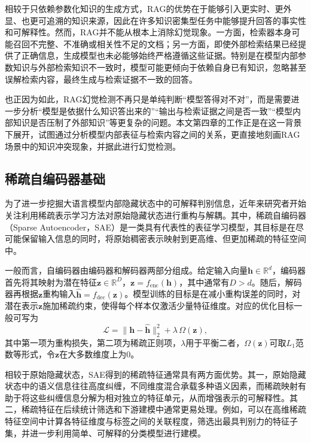 相较于只依赖参数化知识的生成方式，RAG的优势在于能够引入更实时、更外显、也更可追溯的知识来源，因此在许多知识密集型任务中能够提升回答的事实性和可解释性。然而，RAG并不能从根本上消除幻觉现象。一方面，检索器本身可能召回不完整、不准确或相关性不足的文档；另一方面，即使外部检索结果已经提供了正确信息，生成模型也未必能够始终严格遵循这些证据。特别是在模型内部参数知识与外部检索知识不一致时，模型可能更倾向于依赖自身已有知识，忽略甚至误解检索内容，最终生成与检索证据不一致的回答。

也正因为如此，RAG幻觉检测不再只是单纯判断“模型答得对不对”，而是需要进一步分析“模型是依据什么知识答出来的”“输出与检索证据之间是否一致”“模型内部知识是否压制了外部知识”等更复杂的问题。本文第四章的工作正是在这一背景下展开，试图通过分析模型内部表征与检索内容之间的关系，更直接地刻画RAG场景中的知识冲突现象，并据此进行幻觉检测。

\subsection{稀疏自编码器基础}

为了进一步挖掘大语言模型内部隐藏状态中的可解释判别信息，近年来研究者开始关注利用稀疏表示学习方法对原始隐藏状态进行重构与解耦。其中，稀疏自编码器（Sparse Autoencoder，SAE）\cite{shu2025survey,ng2011sparse,bricken2023towards,huben2024sparse}是一类具有代表性的表征学习模型，其目标是在尽可能保留输入信息的同时，将原始稠密表示映射到更高维、但更加稀疏的特征空间中。

一般而言，自编码器由编码器和解码器两部分组成。给定输入向量$\mathbf{h}\in\mathbb{R}^{d}$，编码器首先将其映射为潜在特征$\mathbf{z}\in\mathbb{R}^{D}$，$\mathbf{z}=f_{\mathrm{enc}}(\mathbf{h})$，其中通常有$D>d$。随后，解码器再根据$\mathbf{z}$重构输入$\hat{\mathbf{h}}=f_{\mathrm{dec}}(\mathbf{z})$。模型训练的目标是在减小重构误差的同时，对潜在表示$\mathbf{z}$施加稀疏约束，使得每个样本仅激活少量特征维度。对应的优化目标一般可写为
\begin{equation}
\mathcal{L}=\|\mathbf{h}-\hat{\mathbf{h}}\|_2^2+\lambda \,\Omega(\mathbf{z}),
\end{equation}
其中第一项为重构损失，第二项为稀疏正则项，$\lambda$用于平衡二者，$\Omega(\mathbf{z})$可取$L_1$范数等形式，令$\mathbf{z}$在大多数维度上为0。

相较于原始隐藏状态，SAE得到的稀疏特征通常具有两方面优势。其一，原始隐藏状态中的语义信息往往高度纠缠，不同维度混合承载多种语义因素，而稀疏映射有助于将这些纠缠信息分解为相对独立的特征单元，从而增强表示的可解释性。其二，稀疏特征在后续统计筛选和下游建模中通常更易处理。例如，可以在高维稀疏特征空间中计算各特征维度与标签之间的关联程度，筛选出最具判别力的特征子集，并进一步利用简单、可解释的分类模型进行建模。

